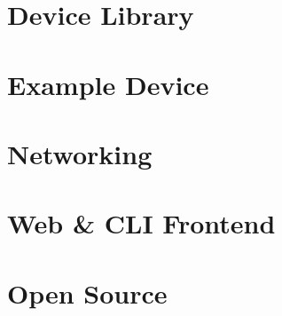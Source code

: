 \section{Device Library} \label{sec:chap3:devicelib}
\section{Example Device} \label{sec:chap3:deviceexample}
\section{Networking}

\section{Web \& CLI Frontend} \label{sec:chap3:frontend}
\section{Open Source} \label{sec:chap3:opensource}
